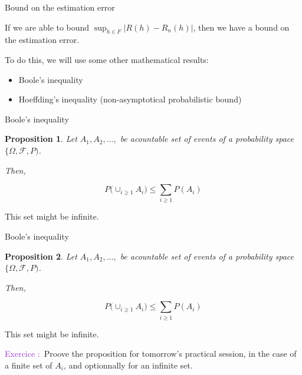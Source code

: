 \documentclass[usenames,dvipsnames]{beamer}
\newtheorem*{proposition}{Proposition}
\newcounter{numexos}%
\newcommand{\exercice}[1]{%
\addtocounter{numexos}{1}%
\textcolor{DarkOrchid}{Exercice\,\thenumexos\,:}\,#1%
}
\begin{document}
\begin{frame}{Bound on the estimation error}

    If we are able to bound $\sup_{h\in F}|R(h)-R_n(h)|$, then we have a bound on the estimation error.

    To do this, we will use some other mathematical results:

    \begin{itemize}
        \item Boole's inequality
	\item Hoeffding's inequality (non-asymptotical probabilistic bound)
    \end{itemize}
    
\end{frame}

\begin{frame}{Boole's inequality}
\begin{proposition}

    Let $A_1, A_2, \dots, $ be  acountable set of events of a probability space $\{\Omega, \mathcal{F}, P)$.

    Then, 

    \begin{equation}
	P\Big( \cup_{i\geq 1}A_i \Big) \leq \sum_{i\geq 1} P(A_i)
    \end{equation}
    
\end{proposition}


    This set might be infinite.
    
\end{frame}

\begin{frame}{Boole's inequality}
\begin{proposition}

    Let $A_1, A_2, \dots, $ be  acountable set of events of a probability space $\{\Omega, \mathcal{F}, P)$.

    Then, 

    \begin{equation}
	P\Big( \cup_{i\geq 1}A_i \Big) \leq \sum_{i\geq 1} P(A_i)
    \end{equation}
    
\end{proposition}


    This set might be infinite.

    \exercice{\textbf{}}Proove the proposition for tomorrow's practical session, in the case of a finite set of $A_i$, and optionnally for an infinite set.
    
\end{frame}
\end{document}
